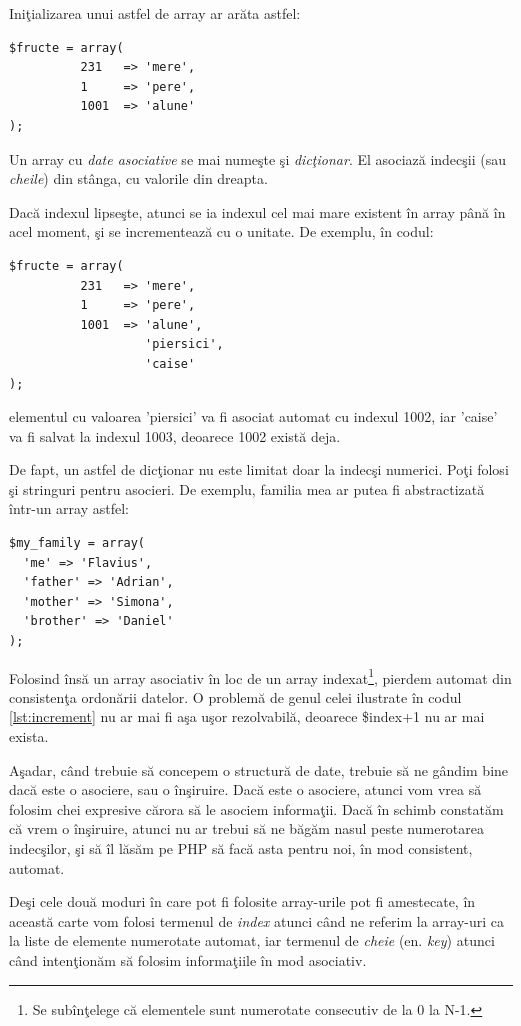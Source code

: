 Iniţializarea unui astfel de array ar arăta astfel:
\begin{lstlisting}
$fructe = array(
		  231	=> 'mere',
		  1		=> 'pere',
		  1001	=> 'alune'
);
\end{lstlisting}
Un array cu \textsl{date asociative} se mai numeşte şi \textsl{dicţionar}. El asociază
indecşii (sau \textsl{cheile}) din stânga, cu valorile din dreapta.


Dacă indexul lipseşte, atunci se ia indexul cel mai mare
existent în array până în acel moment, şi se incrementează cu o unitate.
De exemplu, în codul:
\begin{lstlisting}
$fructe = array(
		  231	=> 'mere',
		  1		=> 'pere',
		  1001	=> 'alune',
				   'piersici',
				   'caise'
);
\end{lstlisting}
elementul cu valoarea 'piersici' va fi asociat automat cu indexul 1002, iar 'caise'
va fi salvat la indexul 1003, deoarece 1002 există deja.

De fapt, un astfel de dicţionar nu este limitat doar la indecşi numerici.
Poţi folosi şi stringuri pentru asocieri. De exemplu, familia mea
ar putea fi abstractizată într-un array astfel:

\begin{lstlisting}
$my_family = array(
  'me' => 'Flavius',
  'father' => 'Adrian',
  'mother' => 'Simona',
  'brother' => 'Daniel'
);
\end{lstlisting}

Folosind însă un array asociativ în loc de un array indexat\footnote{Se subînţelege
că elementele sunt numerotate consecutiv de la 0 la N-1.}, pierdem automat
din consistenţa ordonării datelor. O problemă de genul celei ilustrate în
codul \ref{lst:increment} nu ar mai fi aşa uşor rezolvabilă, deoarece {\glqq}\$index+1{\grqq}
nu ar mai exista.

Aşadar, când trebuie să concepem o structură de date, trebuie să ne gândim
bine dacă este o asociere, sau o înşiruire. Dacă este o asociere, atunci
vom vrea să folosim chei expresive cărora să le asociem informaţii. Dacă
în schimb constatăm că vrem o înşiruire, atunci nu ar trebui să
ne băgăm nasul peste numerotarea indecşilor, şi să îl lăsăm pe PHP
să facă asta pentru noi, în mod consistent, automat.

Deşi cele două moduri în care pot fi folosite array-urile pot fi amestecate,
în această carte vom folosi termenul de \textsl{index} atunci când ne referim la
array-uri ca la liste de elemente numerotate automat, iar termenul de \textsl{cheie} (en. \textsl{key})
atunci când intenţionăm să folosim informaţiile în mod asociativ.

